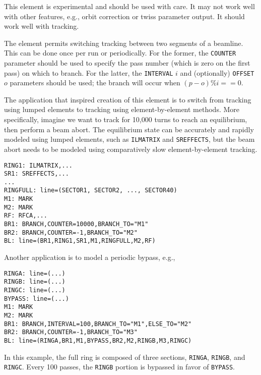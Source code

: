 This element is experimental and should be used with care.
It may not work well with other features, e.g., orbit correction or twiss parameter output.
It should work well with tracking.

The element permits switching tracking between two segments of a beamline. This can be done once per run
or periodically. For the former, the \verb|COUNTER| parameter should be used to specify the pass number (which
is zero on the first pass) on which to branch.
For the latter, the \verb|INTERVAL| $i$ and (optionally) \verb|OFFSET| $o$ parameters should be used; the branch will occur
when $(p-o) \% i == 0$.

The application that inspired creation of this element is to switch from tracking using lumped elements to tracking
using element-by-element methods.
More specifically, imagine we want to track for 10,000 turns to reach an equilibrium, then perform a beam abort.
The equilibrium state can be accurately and rapidly modeled using lumped elements, such as \verb|ILMATRIX| and \verb|SREFFECTS|,
but the beam abort needs to be modeled using comparatively slow element-by-element tracking.
\begin{verbatim}
RING1: ILMATRIX,...
SR1: SREFFECTS,...
...
RINGFULL: line=(SECTOR1, SECTOR2, ..., SECTOR40)
M1: MARK
M2: MARK
RF: RFCA,...
BR1: BRANCH,COUNTER=10000,BRANCH_TO="M1"
BR2: BRANCH,COUNTER=-1,BRANCH_TO="M2"
BL: line=(BR1,RING1,SR1,M1,RINGFULL,M2,RF)
\end{verbatim}

Another application is to model a periodic bypass, e.g.,
\begin{verbatim}
RINGA: line=(...)
RINGB: line=(...)
RINGC: line=(...)
BYPASS: line=(...)
M1: MARK
M2: MARK
BR1: BRANCH,INTERVAL=100,BRANCH_TO="M1",ELSE_TO="M2"
BR2: BRANCH,COUNTER=-1,BRANCH_TO="M3"
BL: line=(RINGA,BR1,M1,BYPASS,BR2,M2,RINGB,M3,RINGC)
\end{verbatim}
In this example, the full ring is composed of three sections, \verb|RINGA|, \verb|RINGB|, and \verb|RINGC|.
Every 100 passes, the \verb|RINGB| portion is bypassed in favor of \verb|BYPASS|.

